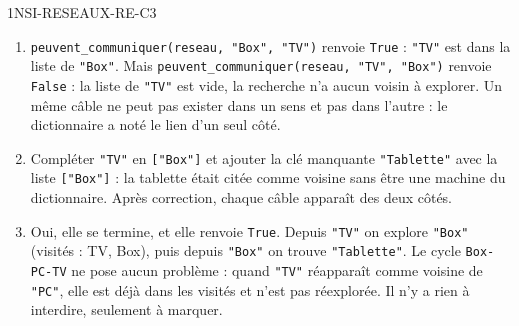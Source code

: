 \begin{corrige}{1NSI-RESEAUX-RE-C3}
\begin{enumerate}
  \item \lstinline{peuvent_communiquer(reseau, "Box", "TV")} renvoie \lstinline{True} :
        \lstinline{"TV"} est dans la liste de \lstinline{"Box"}. Mais
        \lstinline{peuvent_communiquer(reseau, "TV", "Box")} renvoie \lstinline{False} : la
        liste de \lstinline{"TV"} est vide, la recherche n'a aucun voisin à explorer. Un même
        câble ne peut pas exister dans un sens et pas dans l'autre : le dictionnaire a noté
        le lien d'un seul côté.
  \item Compléter \lstinline{"TV"} en \lstinline{["Box"]} et ajouter la clé manquante
        \lstinline{"Tablette"} avec la liste \lstinline{["Box"]} : la tablette était citée
        comme voisine sans être une machine du dictionnaire. Après correction, chaque câble
        apparaît des deux côtés.
  \item Oui, elle se termine, et elle renvoie \lstinline{True}. Depuis \lstinline{"TV"} on
        explore \lstinline{"Box"} (visités : TV, Box), puis depuis \lstinline{"Box"} on trouve
        \lstinline{"Tablette"}. Le cycle \lstinline{Box-PC-TV} ne pose aucun problème : quand
        \lstinline{"TV"} réapparaît comme voisine de \lstinline{"PC"}, elle est déjà dans les
        visités et n'est pas réexplorée. Il n'y a rien à interdire, seulement à marquer.
\end{enumerate}
\end{corrige}
